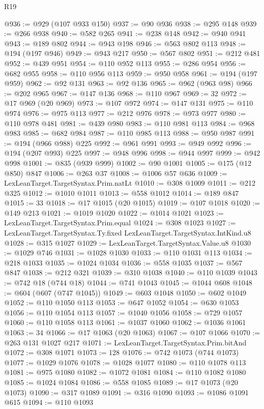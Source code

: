 \begin{lexlean}{R19}
\begin{coremodule}
@936 := @929 (@107 @933 @150)
@937 := @90 @936
@938 := @295 @148
@939 := @266 @938
@940 := @582 @265
@941 := @238 @148
@942 := @940 @941
@943 := @189 @802
@944 := @943 @198
@946 := @563 @802 @113
@948 := @194 (@197 @946)
@949 := @943 @217
@950 := @567 @802
@951 := @212 @481
@952 := @439 @951
@954 := @110 @952 @113
@955 := @286 @954
@956 := @682 @955
@958 := @110 @956 @113
@959 := @950 @958
@961 := @194 (@197 @959)
@962 := @92 @131
@963 := @92 @136
@965 := @962 (@963 @98)
@966 := @202 @965
@967 := @147 @136
@968 := @110 @967
@969 := 32
@972 := @17 @969 (@20 @969)
@973 := @107 @972
@974 := @147 @131
@975 := @110 @974
@976 := @975 @113
@977 := @212 @976
@978 := @973 @977
@980 := @110 @978 @481
@981 := @439 @980
@983 := @110 @981 @113
@984 := @968 @983
@985 := @682 @984
@987 := @110 @985 @113
@988 := @950 @987
@991 := @194 (@966 @988) @225
@992 := @961 @991
@993 := @949 @992
@996 := @194 (@207 @993) @225
@997 := @948 @996
@998 := @944 @997
@999 := @942 @998
@1001 := @835 (@939 @999)
@1002 := @90 @1001
@1005 := @175 (@12 @850) @847
@1006 := @263 @37
@1008 := @1006 @57 @636
@1009 := LexLeanTarget.TargetSyntax.Prim.natLt
@1010 := @308 @1009
@1011 := @212 @325
@1012 := @1010 @1011
@1013 := @558 @1012
@1014 := @189 @847
@1015 := 33
@1018 := @17 @1015 (@20 @1015)
@1019 := @107 @1018
@1020 := @149 @213
@1021 := @1019 @1020
@1022 := @1014 @1021
@1023 := LexLeanTarget.TargetSyntax.Prim.equal
@1024 := @308 @1023
@1027 := LexLeanTarget.TargetSyntax.Ty.fixed LexLeanTarget.TargetSyntax.IntKind.u8
@1028 := @315 @1027
@1029 := LexLeanTarget.TargetSyntax.Value.u8
@1030 := @1029 @746
@1031 := @1028 @1030
@1033 := @110 @1031 @113
@1034 := @218 @1033
@1035 := @1024 @1034
@1036 := @558 @1035
@1037 := @567 @847
@1038 := @212 @321
@1039 := @310 @1038
@1040 := @110 @1039
@1043 := @742 @18 (@744 @18)
@1044 := @741 @1043
@1045 := @1044 @608
@1048 := @604 (@607 (@747 @1045))
@1049 := @603 @1048
@1050 := @602 @1049
@1052 := @110 @1050 @113
@1053 := @647 @1052
@1054 := @630 @1053
@1056 := @110 @1054 @113
@1057 := @1040 @1056
@1058 := @729 @1057
@1060 := @110 @1058 @113
@1061 := @1037 @1060
@1062 := @1036 @1061
@1063 := 34
@1066 := @17 @1063 (@20 @1063)
@1067 := @107 @1066
@1070 := @263 @131 @1027 @217
@1071 := LexLeanTarget.TargetSyntax.Prim.bitAnd
@1072 := @308 @1071
@1073 := 128
@1076 := @742 @1073 (@744 @1073)
@1077 := @1029 @1076
@1078 := @1028 @1077
@1080 := @110 @1078 @113
@1081 := @975 @1080
@1082 := @1072 @1081
@1084 := @110 @1082 @1080
@1085 := @1024 @1084
@1086 := @558 @1085
@1089 := @17 @1073 (@20 @1073)
@1090 := @317 @1089
@1091 := @316 @1090
@1093 := @1086 @1091 @615
@1094 := @110 @1093

\end{coremodule}
\end{lexlean}
